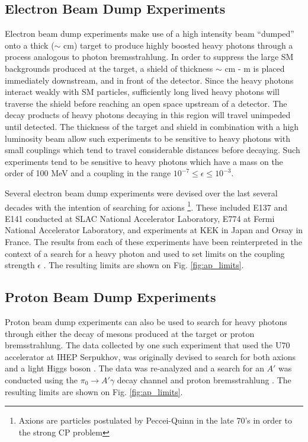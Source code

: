 \subsection{Electron Beam Dump Experiments}

Electron beam dump experiments make use of a high intensity beam ``dumped'' onto
a thick ($\sim$ cm) target to produce highly boosted heavy photons through a 
process analogous to photon bremsstrahlung.  In order to suppress the large
SM backgrounds produced at the target, a shield of thickness $\sim$ cm - m
is placed immediately downstream, and in front of the detector.  Since the 
heavy photons interact weakly with SM particles, sufficiently long lived 
heavy photons will traverse the shield before reaching an open space upstream
of a detector.  The decay products of heavy photons decaying in this region 
will travel unimpeded until detected.
The thickness of the target and shield in combination with a high luminosity
beam allow such experiments to be sensitive to heavy photons with small 
couplings which tend to travel considerable distances before decaying. Such 
experiments tend to be sensitive to heavy photons which have a mass on the order
of 100 MeV and a coupling in the range $10^{-7} \le \epsilon \le 10^{-3}$.


Several electron beam dump experiments were devised over the last several decades with
the intention of searching for axions \footnote{Axions are particles postulated 
by Peccei-Quinn in the late 70's in order to the strong CP problem}.  These 
included E137 \cite{Bjorken:1988as}
and E141 \cite{riordan1987} conducted at SLAC National Accelerator Laboratory,
E774 \cite{bross1991} at Fermi National Accelerator Laboratory, and experiments at 
KEK \cite{konaka1986} in Japan and Orsay \cite{davier1989} in France. 
The results from each of these experiments have been reinterpreted in the 
context of a search for a heavy photon and used to set limits on the coupling
strength $\epsilon$ \cite{Bjorken:2009mm, andreas2012}.  The resulting limits are 
shown on Fig. \ref{fig:ap_limits}.

\subsection{Proton Beam Dump Experiments}

Proton beam dump experiments can also be used to search for heavy photons
through either the decay of mesons produced at the target or proton
bremsstrahlung.  The data collected by one such experiment that used the U70
accelerator at IHEP Serpukhov, was originally devised to search for both axions
and a light Higgs boson \cite{Blumlein:1990ay, Blumlein:1991xh}.  The data was 
re-analyzed and a search for an $A'$ was conducted
using the $\pi_0 \rightarrow A'\gamma$ decay channel and proton bremsstrahlung
\cite{johannes2011, johannes2014}. The resulting limits are shown on Fig. 
\ref{fig:ap_limits}.

